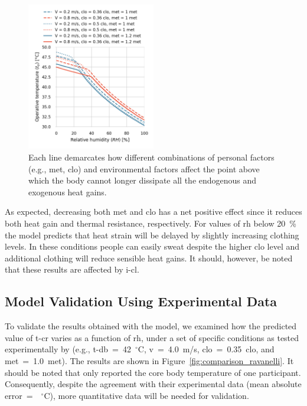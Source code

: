 \begin{figure}[thb!]
    \centering
    \includegraphics[width=0.5\textwidth]{figures/met_clo}
    \caption{Each line demarcates how different combinations of personal factors (e.g., \ac{met}, \ac{clo}) and environmental factors affect the point above which the body cannot longer dissipate all the endogenous and exogenous heat gains.}
    \label{fig:met_clo}
\end{figure}

As expected, decreasing both \ac{met} and \ac{clo} has a net positive effect since it reduces both heat gain and thermal resistance, respectively.
For values of \ac{rh} below 20~\% the model predicts that heat strain will be delayed by slightly increasing clothing levels.
In these conditions people can easily sweat despite the higher clo level and additional clothing will reduce sensible heat gains.
It should, however, be noted that these results are affected by \ac{i-cl}.

\subsection{Model Validation Using Experimental Data}\label{subsec:model-validation-experimental-data}

To validate the results obtained with the  model, we examined how the predicted value of \ac{t-cr} varies as a function of \ac{rh}, under a set of specific conditions as tested experimentally by  (e.g., \ac{t-db}~=~42~$^{\circ}$C, \ac{v}~=~4.0~m/s, \ac{clo}~=~0.35~clo, and \ac{met}~=~1.0~met).
The results are shown in Figure~\ref{fig:comparison_ravanelli}.
It should be noted that  only reported the core body temperature of one participant.
Consequently, despite the agreement with their experimental data (mean absolute error~=~~$^{\circ}$C), more quantitative data will be needed for validation.

